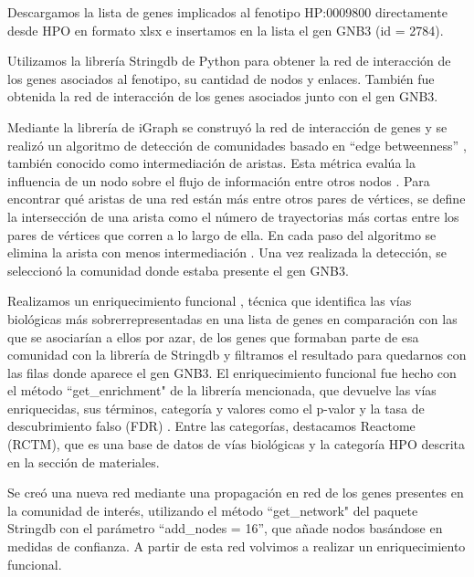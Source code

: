 Descargamos la lista de genes implicados al fenotipo HP:0009800 directamente desde HPO en formato xlsx e insertamos en la lista el gen GNB3 (id = 2784).

Utilizamos la librería Stringdb de Python para obtener la red de interacción de los genes asociados al fenotipo, su cantidad de nodos y enlaces. También fue obtenida la red de interacción de los genes asociados junto con el gen GNB3.

Mediante la librería de iGraph se construyó la red de interacción de genes y se realizó un algoritmo de detección de comunidades basado en ``edge betweenness'' \cite{Girvan2002}, también conocido como intermediación de aristas. Esta métrica evalúa la influencia de un nodo sobre el flujo de información entre otros nodos  \cite{Girvan2002}. Para encontrar qué aristas de una red están más entre otros pares de vértices, se define la intersección de una arista como el número de trayectorias más cortas entre los pares de vértices que corren a lo largo de ella. En cada paso del algoritmo se elimina la arista con menos intermediación  \cite{Girvan2002}. Una vez realizada la detección, se seleccionó la comunidad donde estaba presente el gen GNB3.

Realizamos un enriquecimiento funcional \cite{Chicco2022}, técnica que identifica las vías biológicas más sobrerrepresentadas en una lista de genes en comparación con las que se asociarían a ellos por azar, de los genes que formaban parte de esa comunidad con la librería de Stringdb y filtramos el resultado para quedarnos con las filas donde aparece el gen GNB3. El enriquecimiento funcional fue hecho con el método ``get\_enrichment" de la librería mencionada, que devuelve las vías enriquecidas, sus términos, categoría y  valores como el p-valor y la tasa de descubrimiento falso (FDR) . Entre las categorías, destacamos Reactome (RCTM), que es una base de datos de vías biológicas \cite{Gillespie2021} y la categoría HPO \cite{Kohler2017} descrita en la sección de materiales.

Se creó una nueva red mediante una propagación en red de los genes presentes en la comunidad de interés, utilizando el método ``get\_network" del paquete Stringdb con el parámetro ``add\_nodes = 16'', que añade nodos basándose en medidas de confianza. A partir de esta red volvimos a realizar un enriquecimiento funcional.